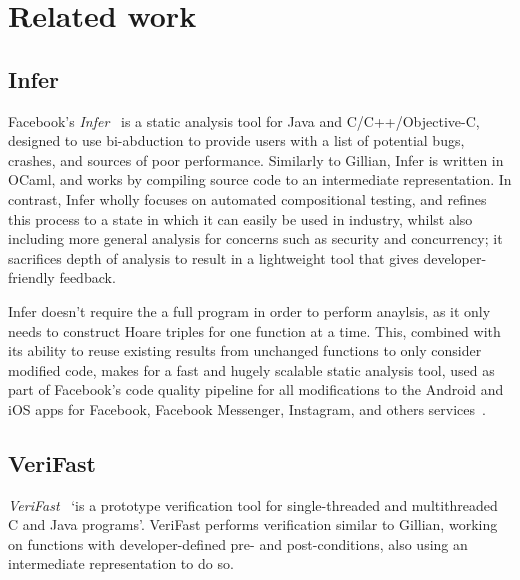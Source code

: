 
\section{Related work}
\label{sec:background:related-work}

\subsection{Infer}

Facebook's \textit{Infer}~\cite{infer, infer-site} is a static analysis tool
for Java and C/C++/Objective-C, designed to use bi-abduction to provide users
with a list of potential bugs, crashes, and sources of poor performance.
Similarly to Gillian, Infer is written in OCaml, and works by compiling source
code to an intermediate representation. In contrast, Infer wholly focuses on
automated compositional testing, and refines this process to a state in which
it can easily be used in industry, whilst also including more general analysis
for concerns such as security and concurrency; it sacrifices depth of analysis
to result in a lightweight tool that gives developer-friendly feedback.

Infer doesn't require the a full program in order to perform anaylsis, as it
only needs to construct Hoare triples for one function at a time. This,
combined with its ability to reuse existing results from unchanged functions to
only consider modified code, makes for a fast and hugely scalable static
analysis tool, used as part of Facebook's code quality pipeline for all
modifications to the Android and iOS apps for Facebook, Facebook Messenger,
Instagram, and others services~\cite{infer-about}.

\subsection{VeriFast}

\textit{VeriFast}~\cite{verifast-paper, verifast-repo} `is a prototype
verification tool for single-threaded and multithreaded C and Java programs'.
VeriFast performs verification similar to Gillian, working on functions with
developer-defined pre- and post-conditions, also using an intermediate
representation to do so.


